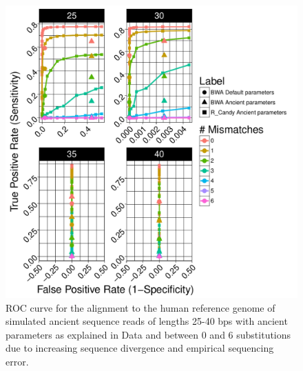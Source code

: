 \documentclass[11pt,a4paper]{report}
\begin{document}
\begin{figure}[H]
\centering
\includegraphics[width=12cm]{pictures/bROC_DS4_ART.pdf}
\caption{
ROC curve for the alignment to the human reference genome of simulated ancient 
sequence reads of lengths 25-40 bps with ancient parameters as explained in Data 
and between 0 and 6 substitutions due to increasing sequence divergence and
empirical sequencing error.
}
\label{DS4_ART}
\end{figure}





\end{document}
